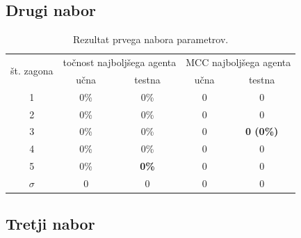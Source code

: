 \subsection{Drugi nabor}\label{subsec:dodatek-statlog-drugi-nabor}
\begin{table}[H]
    \begin{center}
        \begin{tabular}{|| c | c c || c c ||}
            \hline
            \multirow{2}{*}{št. zagona} & \multicolumn{2}{c||}{točnost najboljšega agenta} & \multicolumn{2}{c||}{MCC najboljšega agenta} \\ \cline{2-5}
            & učna & testna       & učna & testna           \\
            \hline
            1        & 0\%  & 0\%          & 0    & 0                \\
            \hline
            2        & 0\%  & 0\%          & 0    & 0                \\
            \hline
            3        & 0\%  & 0\%          & 0    & \textbf{0 (0\%)} \\
            \hline
            4        & 0\%  & 0\%          & 0    & 0                \\
            \hline
            5        & 0\%  & \textbf{0\%} & 0    & 0                \\
            \hline
            $\sigma$ & 0    & 0            & 0    & 0                \\
            \hline
        \end{tabular}
    \end{center}
    \caption{Rezultat prvega nabora parametrov.}
    \label{tab:statlog_result_2}
\end{table}

\subsection{Tretji nabor}\label{subsec:dodatek-statlog-tretji-nabor}
